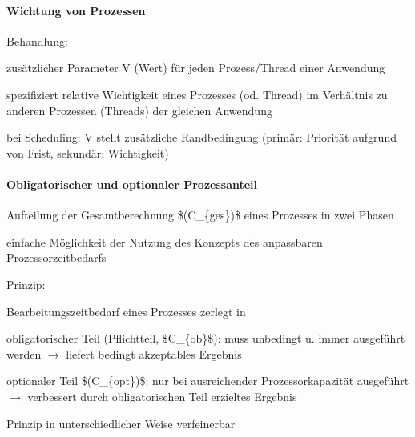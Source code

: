 \documentclass[a4paper]{article}
\begin{document}
\begin{multicols}{3}
    \paragraph{Wichtung von Prozessen}

    Behandlung:

    \begin{itemize*}
        \item
        zusätzlicher Parameter V (Wert) für jeden Prozess/Thread einer
        Anwendung
        \item
        spezifiziert relative Wichtigkeit eines Prozesses (od. Thread) im
        Verhältnis zu anderen Prozessen (Threads) der gleichen Anwendung
        \item
        bei Scheduling: V stellt zusätzliche Randbedingung (primär: Priorität
        aufgrund von Frist, sekundär: Wichtigkeit)
    \end{itemize*}


    \paragraph{Obligatorischer und optionaler
        Prozessanteil}

    \begin{itemize*}
        \item
        Aufteilung der Gesamtberechnung \$(C\_\{ges\})\$ eines Prozesses in
        zwei Phasen
        \item
        einfache Möglichkeit der Nutzung des Konzepts des anpassbaren
        Prozessorzeitbedarfs
        \item
        Prinzip:
        \begin{itemize*}
            \item Bearbeitungszeitbedarf eines Prozesses zerlegt in \begin{enumerate*} \item obligatorischer Teil (Pflichtteil, \$C\_\{ob\}\$): muss unbedingt u. immer ausgeführt werden $\rightarrow$ liefert bedingt akzeptables Ergebnis \item optionaler Teil \$(C\_\{opt\})\$: nur bei ausreichender Prozessorkapazität ausgeführt $\rightarrow$ verbessert durch obligatorischen Teil erzieltes Ergebnis \end{enumerate*}
            \item Prinzip in unterschiedlicher Weise verfeinerbar
        \end{itemize*}
        \item
    \end{itemize*}



\end{multicols}
\end{document}
